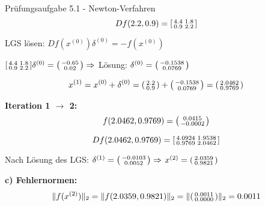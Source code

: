 \begin{example2}{Prüfungsaufgabe 5.1 - Newton-Verfahren}
$$Df(2.2, 0.9) = \begin{bsmallmatrix} 4.4 & 1.8 \\ 0.9 & 2.2 \end{bsmallmatrix}$$

LGS lösen: $Df(x^{(0)}) \delta^{(0)} = -f(x^{(0)})$

$\begin{bsmallmatrix} 4.4 & 1.8 \\ 0.9 & 2.2 \end{bsmallmatrix} \delta^{(0)} = \begin{psmallmatrix} -0.65 \\ 0.02 \end{psmallmatrix} \Rightarrow $
Lösung: $\delta^{(0)} = \begin{psmallmatrix} -0.1538 \\ 0.0769 \end{psmallmatrix}$

$$x^{(1)} = x^{(0)} + \delta^{(0)} = \begin{psmallmatrix} 2.2 \\ 0.9 \end{psmallmatrix} + \begin{psmallmatrix} -0.1538 \\ 0.0769 \end{psmallmatrix} = \begin{psmallmatrix} 2.0462 \\ 0.9769 \end{psmallmatrix}$$

\textbf{Iteration 1 $\rightarrow$ 2:}
$$f(2.0462, 0.9769) = \begin{psmallmatrix} 0.0415 \\ -0.0002 \end{psmallmatrix}$$

$$Df(2.0462, 0.9769) = \begin{bsmallmatrix} 4.0924 & 1.9538 \\ 0.9769 & 2.0462 \end{bsmallmatrix}$$

Nach Lösung des LGS: $\delta^{(1)} = \begin{psmallmatrix} -0.0103 \\ 0.0052 \end{psmallmatrix} \Rightarrow $
$x^{(2)} = \begin{psmallmatrix} 2.0359 \\ 0.9821 \end{psmallmatrix}$

\textbf{c) Fehlernormen:}
$$\|f(x^{(2)})\|_2 = \|f(2.0359, 0.9821)\|_2 = \|\begin{psmallmatrix} 0.0011 \\ 0.0000 \end{psmallmatrix}\|_2 = 0.0011$$


\end{example2}
